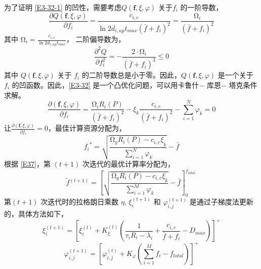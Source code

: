 为了证明 \eqref{E3-32-1} 的凹性，需要考虑$Q\left(\mathbf{f},\xi,\varphi\right)$ 关于$f_i$ 的一阶导数，
\begin{equation}\label{E34}
\!\!\frac{\partial Q\left(\mathbf{f},\xi,\varphi\right)}{\partial f_i}=\frac{c_{i,e}}{\ln{2} d_{i,up}t_{max}\left(\bar{f}+f_i\right)^2}=\frac{\mathrm{\Omega}_i}{\left(\bar{f}+f_i\right)^2}
\end{equation}
其中 $\mathrm{\Omega}_i=\frac{c_{i,e}}{\ln{2}d_{i,up}t_{max}}$， 二阶偏导数为，
\begin{equation}\label{E35}
\frac{\partial^2Q}{\partial f_i^2}=-\frac{2\cdot\mathrm{\Omega}_i}{\left(\bar{f}+f_i\right)^3}\le0
\end{equation}
其中 $Q\left(\mathbf{f},\xi,\varphi\right)$ 关于 $f_i$ 的二阶导数总是小于零。因此，$Q\left(\mathbf{f},\xi,\varphi\right)$ 是一个关于 $f_i$ 的凹函数。因此，\eqref{E3-32} 是一个凸优化问题，可以用卡鲁什$-$ 库恩$-$ 塔克条件求解。
\begin{equation}\label{E36}
\frac{\partial\left(\mathbf{f},\xi,\varphi\right)}{\partial f_i}=\frac{\mathrm{\Omega}_iR_i\left(P\right)}{\left(\bar{f}+f_i\right)^2}-\xi_k\frac{c_{i,e}}{\left(\bar{f}+f_i\right)^2}-\sum_{i=1}^{N}\varphi_k=0
\end{equation}
让$\frac{\partial \left(\mathbf{f},\xi,\varphi\right)}{\partial f_i}=0$，最佳计算资源分配为，
\begin{equation}\label{E37}
{f_i}^\ast=\sqrt{\frac{\mathrm{\Omega}_yR_i\left(P\right)-{c_{i,e}\xi}_k}{\sum_{i=1}^{N}\varphi_k}}-\bar{f}
\end{equation}
根据 \eqref{E37}，第 $(t+1)$ 次迭代的最优计算率分配为，
\begin{equation}\label{E38}
{\tilde{f}}\phantom{}^{\left(t+1\right)}=\left[\sqrt{\frac{\mathrm{\Omega}_yR_i\left(P\right)
-{c_{i,e}\xi}_k}{\sum_{i=1}^{M}\varphi_k}}-\bar{f}\right]_0^{f_{total}\ }
\end{equation}
第$(t+1)$ 次迭代时的拉格朗日乘数 $\eta$, $\xi_i^{\left(t+1\right)}$ 和 $\varphi_{i,j}^{\left(t+1\right)}$ 是通过子梯度法更新的，具体方法如下，
\begin{equation}\label{E39}
\xi_i^{\left(t+1\right)}=\left[\xi_i^{\left(t\right)}\!+\!K_\xi^{\left(t\right)}\!\left(\frac{1}{\tau_iR_i
-\lambda_i}\!+\!\frac{c_{i,e}}{\bar{f}+f_i}\!-\!D_{max}\!\right)\!\right]^+
\end{equation}
\begin{equation}
\varphi_{i,j}^{\left(t+1\right)}=\left[\varphi_{i,j}^{\left(t\right)}+K_\varphi\left(\sum_{i=1}^{M}f_i
-f_{total}\right)\right]^+
\end{equation}
